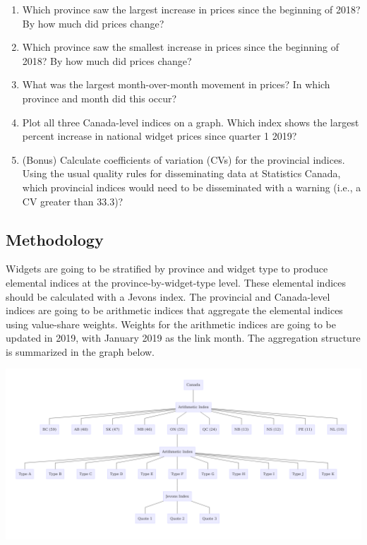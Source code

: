 \documentclass[]{article}
\begin{document}
\begin{enumerate}
\def\labelenumi{\arabic{enumi}.}
\item
  Which province saw the largest increase in prices since the beginning of 2018? By how much did prices change?
\item
  Which province saw the smallest increase in prices since the beginning of 2018? By how much did prices change?
\item
  What was the largest month-over-month movement in prices? In which province and month did this occur?
\item
  Plot all three Canada-level indices on a graph. Which index shows the largest percent increase in national widget prices since quarter 1 2019?
\item
  (Bonus) Calculate coefficients of variation (CVs) for the provincial indices. Using the usual quality rules for disseminating data at Statistics Canada, which provincial indices would need to be disseminated with a warning (i.e., a CV greater than 33.3)?
\end{enumerate}

\hypertarget{methodology}{%
\subsection{Methodology}\label{methodology}}

Widgets are going to be stratified by province and widget type to produce elemental indices at the province-by-widget-type level. These elemental indices should be calculated with a Jevons index. The provincial and Canada-level indices are going to be arithmetic indices that aggregate the elemental indices using value-share weights. Weights for the arithmetic indices are going to be updated in 2019, with January 2019 as the link month. The aggregation structure is summarized in the graph below.

\includegraphics{img/structure.png}
\end{document}
